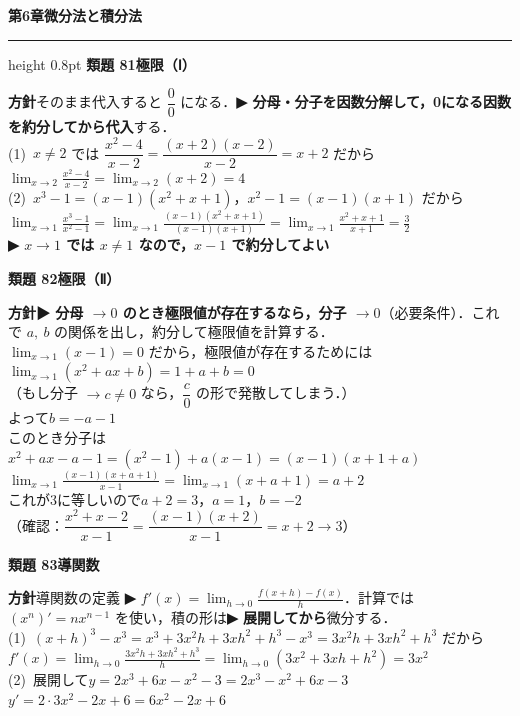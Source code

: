 \documentclass[a4paper,11pt]{ltjsarticle}
\newcommand{\ans}[2]{\Needspace{5\baselineskip}\vspace{6pt}%
  {\sffamily\bfseries 類題 #1\quad #2}\par}
\newcommand{\point}[1]{\textsf{\bfseries ▶ #1}}
\newcommand{\shouans}[2]{\Needspace{8\baselineskip}\vspace{10pt}\markboth{解答\quad #1\quad #2}{}%
  {\sffamily\bfseries\Large #1\quad #2\par}\vspace{2pt}\hrule height 0.8pt\vspace{2pt}}
\begin{document}
\shouans{第6章}{微分法と積分法}
\ans{81}{極限（Ⅰ）}
\begin{kai}
\textbf{方針}\quad そのまま代入すると $\dfrac00$ になる．\point{分母・分子を因数分解して，0になる因数を約分してから代入}する．\\[2pt]
(1)\ $x\neq2$ では $\dfrac{x^2-4}{x-2}=\dfrac{(x+2)(x-2)}{x-2}=x+2$ だから\\
\hspace*{1.5em}$\displaystyle\lim_{x\to2}\frac{x^2-4}{x-2}=\lim_{x\to2}(x+2)=4$\\[2pt]
(2)\ $x^3-1=(x-1)(x^2+x+1)$，$x^2-1=(x-1)(x+1)$ だから\\
\hspace*{1.5em}$\displaystyle\lim_{x\to1}\frac{x^3-1}{x^2-1}=\lim_{x\to1}\frac{(x-1)(x^2+x+1)}{(x-1)(x+1)}=\lim_{x\to1}\frac{x^2+x+1}{x+1}=\frac32$\\
\point{$x\to1$ では $x\neq1$ なので，$x-1$ で約分してよい}
\end{kai}

\ans{82}{極限（Ⅱ）}
\begin{kai}
\textbf{方針}\quad \point{分母 $\to0$ のとき極限値が存在するなら，分子 $\to0$}（必要条件）．これで $a,\ b$ の関係を出し，約分して極限値を計算する．\\[2pt]
$\displaystyle\lim_{x\to1}(x-1)=0$ だから，極限値が存在するためには\quad $\displaystyle\lim_{x\to1}(x^2+ax+b)=1+a+b=0$\\
\hspace*{1.5em}（もし分子 $\to c\neq0$ なら，$\dfrac{c}{0}$ の形で発散してしまう．）\\
よって\quad $b=-a-1$\\[2pt]
このとき分子は\quad $x^2+ax-a-1=(x^2-1)+a(x-1)=(x-1)(x+1+a)$\\
\hspace*{1.5em}$\displaystyle\lim_{x\to1}\frac{(x-1)(x+a+1)}{x-1}=\lim_{x\to1}(x+a+1)=a+2$\\
これが3に等しいので\quad $a+2=3$，\quad $a=1$，\quad $b=-2$\\
（確認：$\dfrac{x^2+x-2}{x-1}=\dfrac{(x-1)(x+2)}{x-1}=x+2\to3$）
\end{kai}

\ans{83}{導関数}
\begin{kai}
\textbf{方針}\quad 導関数の定義 \point{$f'(x)=\displaystyle\lim_{h\to0}\frac{f(x+h)-f(x)}{h}$}．計算では $(x^n)'=nx^{n-1}$ を使い，積の形は\point{展開してから}微分する．\\[2pt]
(1)\ $(x+h)^3-x^3=x^3+3x^2h+3xh^2+h^3-x^3=3x^2h+3xh^2+h^3$ だから\\
\hspace*{1.5em}$f'(x)=\displaystyle\lim_{h\to0}\frac{3x^2h+3xh^2+h^3}{h}=\lim_{h\to0}(3x^2+3xh+h^2)=3x^2$\\[2pt]
(2)\ 展開して\quad $y=2x^3+6x-x^2-3=2x^3-x^2+6x-3$\\
\hspace*{1.5em}$y'=2\cdot3x^2-2x+6=6x^2-2x+6$
\end{kai}
\end{document}
